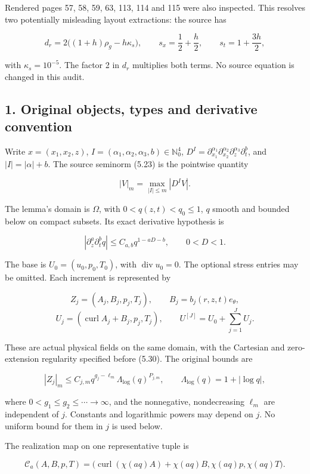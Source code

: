 \documentclass[10pt,a4paper]{article}
\begin{document}
Rendered pages 57, 58, 59, 63, 113, 114 and 115 were also inspected. This resolves two potentially misleading layout extractions: the source has

\[
d_r=2\big((1+h)\rho_g-h\kappa_s\big),\qquad
s_x=\frac12+\frac h2,\qquad s_t=1+\frac{3h}{2},
\]

with \(\kappa_s=10^{-5}\). The factor 2 in \(d_r\) multiplies both terms. No source equation is changed in this audit.

\subsection{1. Original objects, types and derivative convention}\label{original-objects-types-and-derivative-convention}

Write \(x=(x_1,x_2,z)\), \(I=(\alpha_1,\alpha_2,\alpha_3,b)\in\mathbb N_0^4\), \(D^I=\partial_{x_1}^{\alpha_1}\partial_{x_2}^{\alpha_2}\partial_z^{\alpha_3}\partial_t^b\), and \(|I|=|\alpha|+b\). The source seminorm (5.23) is the pointwise quantity

\[
|V|_m=\max_{|I|\le m}|D^IV|.
\]

The lemma's domain is \(\Omega\), with \(0<q(z,t)<q_0\le1\), \(q\) smooth and bounded below on compact subsets. Its exact derivative hypothesis is

\[
|\partial_z^a\partial_t^bq|\le C_{a,b}q^{1-aD-b},\qquad 0<D<1.
\tag{A1}
\]

The base is \(U_0=(u_0,p_0,T_0)\), with \(\operatorname{div}u_0=0\). The optional stress entries may be omitted. Each increment is represented by

\[
Z_j=(A_j,B_j,p_j,T_j),\qquad B_j=b_j(r,z,t)e_\theta,
\] \[
U_j=(\operatorname{curl}A_j+B_j,p_j,T_j),\qquad
U^{[J]}=U_0+\sum_{j=1}^J U_j.
\tag{A2}
\]

These are actual physical fields on the same domain, with the Cartesian and zero-extension regularity specified before (5.30). The original bounds are

\[
|Z_j|_m\le C_{j,m}q^{g_j-\ell_m}\Lambda_{\log}(q)^{P_{j,m}},\qquad
\Lambda_{\log}(q)=1+|\log q|,
\tag{A3}
\]

where \(0<g_1\le g_2\le\cdots\to\infty\), and the nonnegative, nondecreasing \(\ell_m\) are independent of \(j\). Constants and logarithmic powers may depend on \(j\). No uniform bound for them in \(j\) is used below.

The realization map on one representative tuple is

\[
\mathcal C_a(A,B,p,T)
=\big(\operatorname{curl}(\chi(aq)A)+\chi(aq)B,
       \chi(aq)p,\chi(aq)T\big).
\tag{A4}
\]
\end{document}
